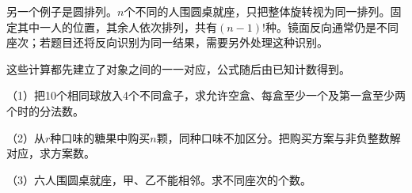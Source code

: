另一个例子是圆排列。\(n\)个不同的人围圆桌就座，只把整体旋转视为同一排列。固定其中一人的位置，其余人依次排列，共有\((n-1)!\)种。镜面反向通常仍是不同座次；若题目还将反向识别为同一结果，需要另外处理这种识别。

这些计算都先建立了对象之间的一一对应，公式随后由已知计数得到。

\begin{exercise}
\mbox{}\par\nobreak

（1）把10个相同球放入4个不同盒子，求允许空盒、每盒至少一个及第一盒至少两个时的分法数。

（2）从\(r\)种口味的糖果中购买\(n\)颗，同种口味不加区分。把购买方案与非负整数解对应，求方案数。

（3）六人围圆桌就座，甲、乙不能相邻。求不同座次的个数。
\end{exercise}
